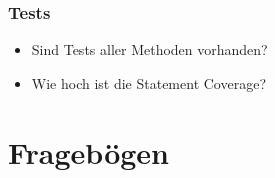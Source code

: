 \documentclass[accentcolor=tud0b,12pt,paper=a4]{tudreport}
\begin{document}
\begin{multicols}{2}
	\subsection{Tests}
	\begin{itemize}
		\item Sind Tests aller Methoden vorhanden?
		\item Wie hoch ist die Statement Coverage?
	\end{itemize}



\end{multicols}

\chapter{Fragebögen}
\end{document}
